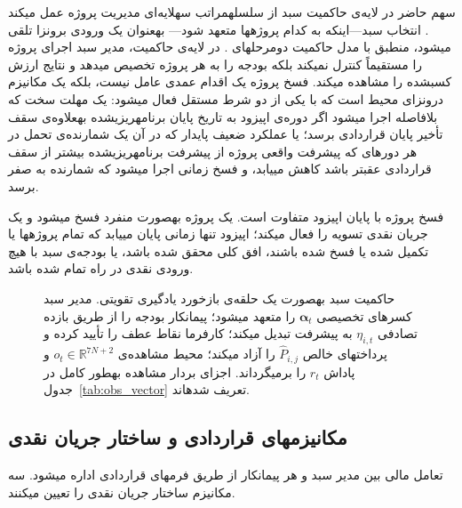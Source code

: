 سهم حاضر در لایه‌ی حاکمیت سبد از سلسله\zwnj{}مراتب سه\zwnj{}لایه‌ای
مدیریت پروژه عمل می\zwnj{}کند \citep{PMI2017}.
انتخاب سبد---اینکه به کدام پروژه\zwnj{}ها متعهد شود---
به\zwnj{}عنوان یک ورودی برون\zwnj{}زا تلقی می\zwnj{}شود،
منطبق با مدل حاکمیت دومرحله\zwnj{}ای \citet{Turner2014}.
در لایه‌ی حاکمیت، مدیر سبد اجرای پروژه را مستقیماً کنترل نمی\zwnj{}کند
بلکه بودجه را به هر پروژه تخصیص می\zwnj{}دهد و نتایج ارزش کسب\zwnj{}شده
را مشاهده می\zwnj{}کند.
فسخ پروژه یک اقدام عمدی عامل نیست، بلکه یک مکانیزم درون\zwnj{}زای محیط
است که با یکی از دو شرط مستقل فعال می\zwnj{}شود:
یک مهلت سخت که بلافاصله اجرا می\zwnj{}شود اگر دوره‌ی اپیزود به
تاریخ پایان برنامه\zwnj{}ریزی\zwnj{}شده به\zwnj{}علاوه‌ی سقف تأخیر پایان قراردادی برسد؛
یا عملکرد ضعیف پایدار که در آن یک شمارنده‌ی تحمل در هر دوره\zwnj{}ای
که پیشرفت واقعی پروژه از پیشرفت برنامه\zwnj{}ریزی\zwnj{}شده بیشتر از سقف قراردادی
عقب\zwnj{}تر باشد کاهش می\zwnj{}یابد، و فسخ زمانی اجرا می\zwnj{}شود که
شمارنده به صفر برسد.

فسخ پروژه با پایان اپیزود متفاوت است.
یک پروژه به\zwnj{}صورت منفرد فسخ می\zwnj{}شود و یک جریان نقدی تسویه را
فعال می\zwnj{}کند؛ اپیزود تنها زمانی پایان می\zwnj{}یابد که تمام پروژه\zwnj{}ها
یا تکمیل شده یا فسخ شده باشند، افق کلی محقق شده باشد،
یا بودجه‌ی سبد با هیچ ورودی نقدی در راه تمام شده باشد.

\begin{figure}[htbp]
  \centering
  \resizebox{\textwidth}{!}{}
  \caption{حاکمیت سبد به\zwnj{}صورت یک حلقه‌ی بازخورد یادگیری تقویتی.
    مدیر سبد کسرهای تخصیصی $\boldsymbol{\alpha}_t$ را متعهد می\zwnj{}شود؛
    پیمانکار بودجه را از طریق بازده تصادفی $\eta_{i,t}$ به پیشرفت
    تبدیل می\zwnj{}کند؛ کارفرما نقاط عطف را تأیید کرده و پرداخت\zwnj{}های
    خالص $\hat{P}_{i,j}$ را آزاد می\zwnj{}کند؛
    محیط مشاهده‌ی $o_t \in \mathbb{R}^{7N+2}$ و پاداش $r_t$
    را برمی\zwnj{}گرداند.
    اجزای بردار مشاهده به\zwnj{}طور کامل در جدول~\ref{tab:obs_vector}
    تعریف شده\zwnj{}اند.}
  \label{fig:feedback_loop}
\end{figure}

\subsection{مکانیزم\zwnj{}های قراردادی و ساختار جریان نقدی}
\label{subsec:contract_mechanics}

تعامل مالی بین مدیر سبد و هر پیمانکار از طریق فرم\zwnj{}های قراردادی
 \citep{FIDIC2017} اداره می\zwnj{}شود.
سه مکانیزم ساختار جریان نقدی را تعیین می\zwnj{}کنند.

